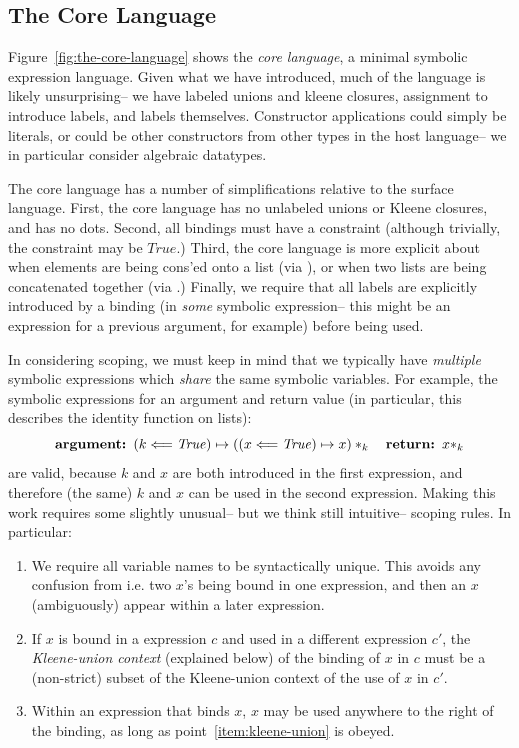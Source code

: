 \subsection{The Core Language} \label{subsec:the-core-language}


Figure~\ref{fig:the-core-language}
shows the \textit{core language},
a minimal symbolic expression language.
Given what we have introduced,
much of the language is likely unsurprising--
we have labeled unions and kleene closures,
assignment to introduce labels,
and labels themselves.
Constructor applications
could simply be literals,
or could be other constructors from other types in the host language--
we in particular consider algebraic datatypes.

The core language has a number of simplifications relative to the surface language.
First, the core language has no
unlabeled unions or Kleene closures,
and has no dots.
Second,
all bindings must have a constraint
(although trivially, the constraint may be $\mathit{True}$.)
Third, the core language is more explicit about when
elements are being cons'ed onto a list (via \cons),
or when two lists are being concatenated together (via \concat.)
Finally, we require that all labels are explicitly introduced by a binding
(in \textit{some} symbolic expression--
this might be an expression for a previous argument,
for example)
before being used.

In considering scoping, we must keep in mind that we typically have
\textit{multiple} symbolic expressions which \textit{share}
the same symbolic variables.
For example, the symbolic expressions for an argument and return value
(in particular, this describes the identity function on lists):
\[
\textbf{argument: }(k \Longleftarrow \mathit{True}) \mapsto ((x \Longleftarrow \mathit{True}) \mapsto x)*_k
\quad
\textbf{return: }x*_k
\]
are valid, because $k$ and $x$ are both introduced in the first expression,
and therefore (the same) $k$ and $x$ can be used in the second expression.
Making this work requires some slightly unusual--
but we think still intuitive--
scoping rules. In particular:
\begin{enumerate}
\item We require all variable names to be syntactically unique.
This avoids any confusion from i.e. two $x$'s being bound in one expression,
and then an $x$ (ambiguously) appear within a later expression.
\item \label{item:kleene-union} If $x$ is bound in a expression $c$
and used in a different expression $c'$,
the \textit{Kleene-union context} (explained below) of the binding of $x$ in $c$
must be a (non-strict) subset of the Kleene-union context of the use of $x$ in $c'$.
\item Within an expression that binds $x$,
$x$ may be used anywhere to the right of the binding,
as long as point~\ref{item:kleene-union} is obeyed.
\end{enumerate}

